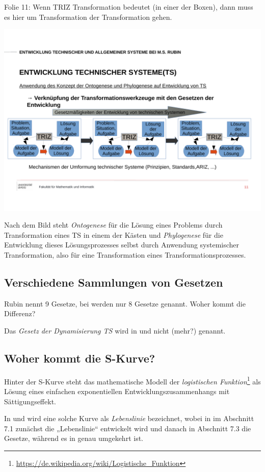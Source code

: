 \documentclass[a4paper,11pt]{article}
\begin{document}
Folie 11: Wenn TRIZ Transformation bedeutet (in einer der Boxen), dann muss es
hier um Transformation der Transformation gehen.

\begin{center}
  \includegraphics[width=.9\textwidth]{Folie11.pdf}
\end{center}

Nach dem Bild steht \emph{Ontogenese} für die Lösung eines Problems durch
Transformation eines TS in einem der Kästen und \emph{Phylogenese} für die
Entwicklung dieses Lösungsprozesses selbst durch Anwendung systemischer
Transformation, also für eine Transformation eines Transformationsprozesses.

\subsection*{Verschiedene Sammlungen von Gesetzen}

Rubin nennt 9 Gesetze, bei \cite{Altschuller1979} werden nur 8 Gesetze
genannt. Woher kommt die Differenz?

Das \emph{Gesetz der Dynamisierung TS} wird in \cite{Altschuller1979} und
\cite{Altschuller1980} nicht (mehr?) genannt.

\subsection*{Woher kommt die S-Kurve?}

Hinter der S-Kurve steht das mathematische Modell der \emph{logistischen
  Funktion}\footnote{\url{https://de.wikipedia.org/wiki/Logistische_Funktion}}
als Lösung eines einfachen exponentiellen Entwicklungszusammenhangs mit
Sättigungseffekt.

In \cite{Altschuller1979} und \cite{Altschuller1980} wird eine solche Kurve
als \emph{Lebenslinie} bezeichnet, wobei in \cite{Altschuller1979} im
Abschnitt 7.1 zunächst die „Lebenslinie“ entwickelt wird und danach in
Abschnitt 7.3 die Gesetze, während es in \cite{Altschuller1980} genau
umgekehrt ist.
\end{document}
